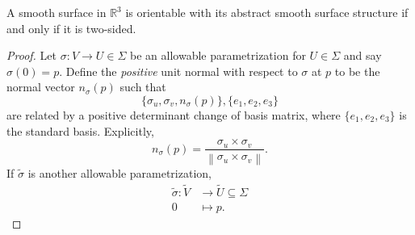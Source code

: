 \leavevmode
\begin{lemma}
    A smooth surface in \(\mathbb{R}^3\) is orientable with its abstract smooth surface structure if and only if it is two-sided.
\end{lemma}
\begin{proof}
    Let \(\sigma: V \to U \in \Sigma\) be an allowable parametrization for \(U\in \Sigma\) and say \(\sigma(0) = p\). Define the \textit{positive} unit normal with respect to \(\sigma\) at \(p\) to be the normal vector \(n_\sigma(p)\) such that
    \[
        \{\sigma_u,\sigma_v,n_\sigma(p)\}, \{e_1, e_2, e_3\}
    \]
    are related by a positive determinant change of basis matrix, where \(\{e_1, e_2, e_3\}\) is the standard basis. Explicitly,
    \[
        n_\sigma(p) = \frac{\sigma_u \times \sigma_v}{\left\lVert \sigma_{u}\times \sigma_{v}\right\rVert }.
    \]
    If \(\tilde{\sigma}\) is another allowable parametrization,
    \[
    \begin{aligned}
      \tilde{\sigma}\colon \tilde{V} & \longrightarrow   \tilde{U}\subseteq \Sigma \\
      0 &\longmapsto p.
    \end{aligned}
    \]
\end{proof}